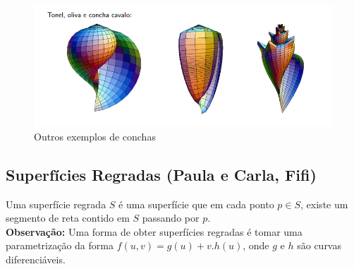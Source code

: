 \documentclass[a4paper]{article}
\begin{document}
\begin{figure}[h!]
\includegraphics[width=.9\textwidth]{picado_conchas.png}
  \caption{Outros exemplos de conchas}
  \label{picado_conchas}
\end{figure}

\subsection{Superfícies Regradas (Paula e Carla, Fifi)}
Uma superfície regrada $S$ é uma superfície que em cada ponto $p ∈ S$, existe um segmento de reta contido em $S$ passando por $p$. 
\\
\textbf{Observação:} Uma forma de obter superfícies regradas é tomar uma parametrização da forma $f(u,v)=g(u)+v.h(u)$, onde $g$ e $h$ são curvas diferenciáveis.
\\
\end{document}
